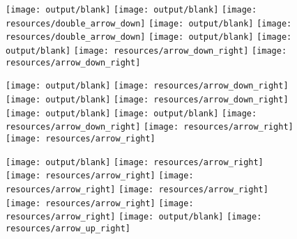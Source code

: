 \documentclass[11pt]{article}
\newcommand{\backgroundimage}{celltypes_alt.pdf} %
\begin{document}


\begin{figure}[htbp]
  \centering
  \begin{minipage}[t]{0.125\textwidth} %
    \centering
    \vspace{-0.3871\linewidth} %
    \texttt{[image: output/blank]}
    \texttt{[image: output/blank]}
    \texttt{[image: resources/double\_arrow\_down]}
    \texttt{[image: output/blank]}
    \texttt{[image: resources/double\_arrow\_down]}
    \texttt{[image: output/blank]}
    \texttt{[image: output/blank]}
    \texttt{[image: resources/arrow\_down\_right]}
    \texttt{[image: resources/arrow\_down\_right]}


  \end{minipage}%
  \begin{minipage}[t]{0.125\textwidth} %
    \centering
    \texttt{[image: output/blank]}
    \texttt{[image: resources/arrow\_down\_right]}
    \texttt{[image: output/blank]}
    \texttt{[image: resources/arrow\_down\_right]}
    \texttt{[image: output/blank]}
    \texttt{[image: output/blank]}
    \texttt{[image: resources/arrow\_down\_right]}
    \texttt{[image: resources/arrow\_right]}
    \texttt{[image: resources/arrow\_right]}
  \end{minipage}%
  \begin{minipage}[t]{0.125\textwidth} %
    \centering
    \vspace{-0.3871\linewidth} %
    \texttt{[image: output/blank]}
    \texttt{[image: resources/arrow\_right]}
    \texttt{[image: resources/arrow\_right]}
    \texttt{[image: resources/arrow\_right]}
    \texttt{[image: resources/arrow\_right]}
    \texttt{[image: resources/arrow\_right]}
    \texttt{[image: resources/arrow\_right]}
    \texttt{[image: output/blank]}
    \texttt{[image: resources/arrow\_up\_right]}


\end{minipage}
\end{figure}
\end{document}
